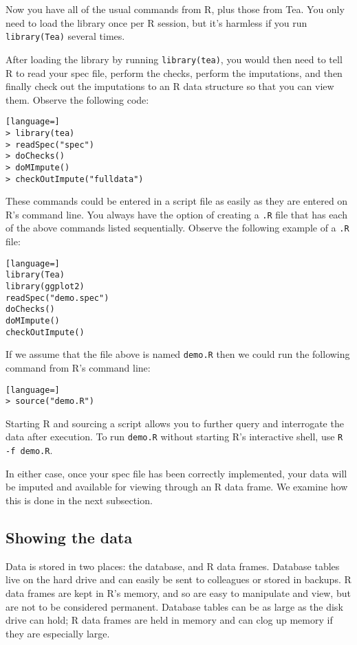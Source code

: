 \documentclass{article}
\begin{document}
Now you have all of the usual commands from R, plus those from Tea. You only
need to load the library once per R session, but it's harmless if you run
{\tt library(Tea)} several times.

After loading the library by running {\tt library(tea)}, you would then need to 
tell R to read your spec file, perform the checks, perform the imputations, 
and then finally check out the imputations to an R data structure so that you 
can view them. Observe the following code:

\begin{lstlisting}[language=]
> library(tea)
> readSpec("spec")
> doChecks()
> doMImpute()
> checkOutImpute("fulldata")
\end{lstlisting}

These commands could be entered in a script file as easily as they are entered on R's command line.
You always have the option of creating a {\tt .R} file that has each of the above commands listed 
sequentially. Observe the following example of a {\tt .R} file:

\begin{lstlisting}[language=]
library(Tea)
library(ggplot2)
readSpec("demo.spec")
doChecks()
doMImpute()
checkOutImpute()
\end{lstlisting}

If we assume that the file above is named {\tt demo.R} then we could run the following command 
from R's command line:

\begin{lstlisting}[language=]
> source("demo.R")
\end{lstlisting}

Starting R and sourcing a script allows you to further query and interrogate the data
after execution. To run {\tt demo.R} without starting R's interactive shell, use {\tt R -f
demo.R}.

In either case, once your spec file has been correctly implemented, your data will
be imputed and available for viewing through an R data frame.  We examine how this is
done in the next subsection.

\subsection{Showing the data}
Data is stored in two places: the database, and R data frames. Database tables
live on the hard drive and can easily be sent to colleagues or stored in
backups. R data frames are kept in R's memory, and so are easy to manipulate and
view, but are not to be considered permanent. Database tables can be as large as
the disk drive can hold; R data frames are held in memory and can clog up memory if
they are especially large.
\end{document}
